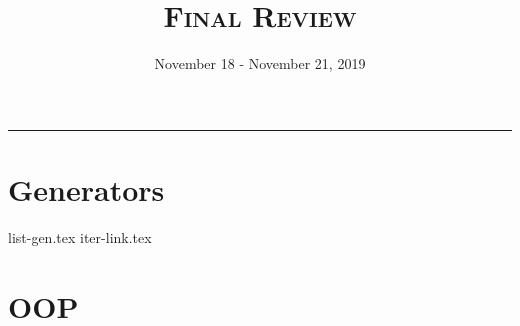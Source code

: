 \documentclass{exam}
\title{\textsc{Final Review}}
\date{November 18 - November 21, 2019}
\begin{document}
\maketitle\rule{\textwidth}{0.15em}
\fontsize{12}{15}\selectfont

\section{Generators}
\begin{questions}
{list-gen.tex}
{iter-link.tex}
\end{questions}

\section{OOP}
\begin{questions}
\end{questions}
\end{document}
